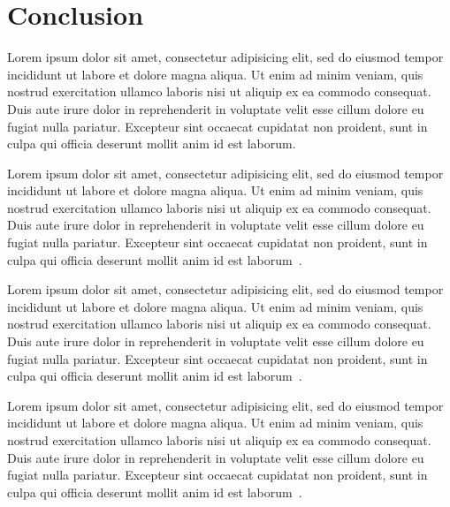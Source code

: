 \chapter{Conclusion}

Lorem ipsum dolor sit amet,
consectetur adipisicing elit,
sed do eiusmod tempor incididunt ut labore et dolore magna aliqua.
Ut enim ad minim veniam,
quis nostrud exercitation ullamco laboris nisi ut aliquip ex ea commodo consequat.
Duis aute irure dolor in reprehenderit in voluptate velit esse cillum dolore eu fugiat nulla pariatur.
Excepteur sint occaecat cupidatat non proident,
sunt in culpa qui officia deserunt mollit anim id est laborum.

Lorem ipsum dolor sit amet,
consectetur adipisicing elit,
sed do eiusmod tempor incididunt ut labore et dolore magna aliqua.
Ut enim ad minim veniam,
quis nostrud exercitation ullamco laboris nisi ut aliquip ex ea commodo consequat.
Duis aute irure dolor in reprehenderit in voluptate velit esse cillum dolore eu fugiat nulla pariatur.
Excepteur sint occaecat cupidatat non proident,
sunt in culpa qui officia deserunt mollit anim id est laborum~\parencite[see][p10]{latexcompanion}.

Lorem ipsum dolor sit amet,
consectetur adipisicing elit,
sed do eiusmod tempor incididunt ut labore et dolore magna aliqua.
Ut enim ad minim veniam,
quis nostrud exercitation ullamco laboris nisi ut aliquip ex ea commodo consequat.
Duis aute irure dolor in reprehenderit in voluptate velit esse cillum dolore eu fugiat nulla pariatur.
Excepteur sint occaecat cupidatat non proident,
sunt in culpa qui officia deserunt mollit anim id est laborum~\parencite[compare][]{knuthwebsite}.

Lorem ipsum dolor sit amet,
consectetur adipisicing elit,
sed do eiusmod tempor incididunt ut labore et dolore magna aliqua.
Ut enim ad minim veniam,
quis nostrud exercitation ullamco laboris nisi ut aliquip ex ea commodo consequat.
Duis aute irure dolor in reprehenderit in voluptate velit esse cillum dolore eu fugiat nulla pariatur.
Excepteur sint occaecat cupidatat non proident,
sunt in culpa qui officia deserunt mollit anim id est laborum~\parencite[e.g.][page 300]{einstein}.
